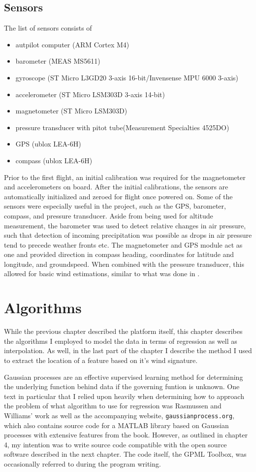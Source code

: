 \documentclass[12pt]{report}
\begin{document}
\section{Sensors}
The list of sensors consists of
\begin{itemize}
\item autpilot computer (ARM Cortex M4)
\item barometer (MEAS MS5611)
\item gyroscope (ST Micro L3GD20 3-axis 16-bit/Invensense MPU 6000 3-axis)
\item accelerometer (ST Micro LSM303D 3-axis 14-bit)
\item magnetometer (ST Micro LSM303D)
\item pressure transducer  with pitot tube(Measurement Specialties 4525DO)
\item GPS (ublox LEA-6H)
\item compass (ublox LEA-6H)
\end{itemize}
Prior to the first flight, an initial calibration was required for the magnetometer and accelerometers on board. After the initial calibrations, the sensors are automatically initialized and zeroed for flight once powered on. 
Some of the sensors were especially useful in the project, such as the GPS, barometer, compass, and pressure transducer. Aside from being used for altitude measurement, the barometer was used to detect relative changes in air pressure, such that detection of incoming precipitation was possible as drops in air pressure tend to precede weather fronts etc. The magnetometer and GPS module act as one and provided direction in compass heading, coordinates for latitude and longitude, and groundspeed. When combined with the pressure transducer, this allowed for basic wind estimations, similar to what was done in \cite{Ariff11}.

\chapter{Algorithms}
While the previous chapter described the platform itself, this chapter describes the algorithms I employed to model the data in terms of regression as well as interpolation. As well, in the last part of the chapter I describe the method I used to extract the location of a feature based on it's wind signature.

Gaussian processes are an effective supervised learning method for determining the underlying function behind data if the governing funtion is unknown. One text in particular that I relied upon heavily when determining how to approach the problem of what algorithm to use for regression was Rasmussen and Williams' work \cite{Rasmussen06} as well as the accompanying website, \texttt{gaussianprocess.org}, which also contains source code for a MATLAB library based on Gaussian processes with extensive features from the book. However, as outlined in chapter 4, my intention was to write source code compatible with the open source software described in the next chapter. The code itself, the GPML Toolbox, was occasionally referred to during the program writing.
\end{document}
